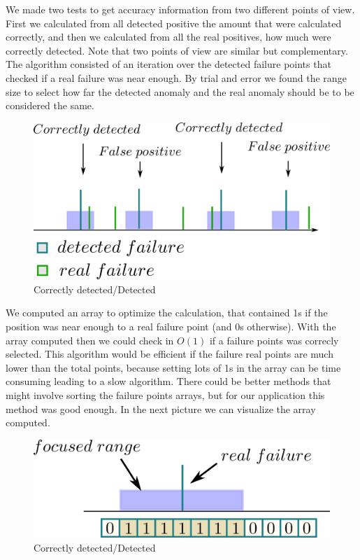 \documentclass[conference]{IEEEtran}
\begin{document}
We made two tests to get accuracy information from two different points of view. First we calculated from all detected positive the amount that were calculated correctly, and then we calculated from all the real positives, how much were correctly detected. Note that two points of view are similar but complementary. 
The algorithm consisted of an iteration over the detected failure points that checked if a real failure was near enough. By trial and error we found the range size to select how far the detected anomaly and the real anomaly should be to be considered the same.  
\begin{figure}[H]
\centerline{\includegraphics[scale=0.8]{imagenes/comparisonAlgo.png}}
\caption{Correctly detected/Detected}
\label{fig}
\end{figure}

We computed an array to optimize the calculation, that contained 1s if the position was near enough to a real failure point (and 0s otherwise). With the array computed then we could check in $O(1)$ if a failure points was correcly selected. This algorithm would be efficient if the failure real points are much lower than the total points, because setting lots of 1s in the array can be time consuming leading to a slow algorithm. There could be better methods that might involve sorting the failure points arrays, but for our application this method was good enough. In the next picture we can visualize the array computed.

\begin{figure}[H]
\centerline{\includegraphics[scale=0.8]{imagenes/arrayExplain.png}}
\caption{Correctly detected/Detected}
\label{fig}
\end{figure}
\end{document}
